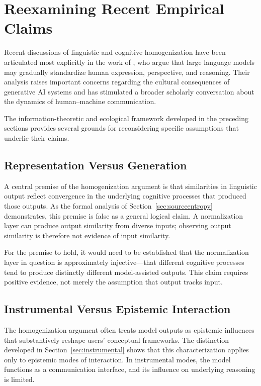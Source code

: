 \documentclass[12pt,a4paper]{article}
\theoremstyle{definition}
\theoremstyle{plain}
\theoremstyle{remark}
\begin{document}
\section{Reexamining Recent Empirical Claims}
\label{sec:sourati}

Recent discussions of linguistic and cognitive homogenization have been articulated most
explicitly in the work of \citet{sourati2026}, who argue that large language models may
gradually standardize human expression, perspective, and reasoning. Their analysis raises
important concerns regarding the cultural consequences of generative AI systems and has
stimulated a broader scholarly conversation about the dynamics of human--machine
communication.

The information-theoretic and ecological framework developed in the preceding sections
provides several grounds for reconsidering specific assumptions that underlie their claims.

\subsection{Representation Versus Generation}

A central premise of the homogenization argument is that similarities in linguistic output
reflect convergence in the underlying cognitive processes that produced those outputs. As the
formal analysis of Section~\ref{sec:sourceentropy} demonstrates, this premise is false as a
general logical claim. A normalization layer can produce output similarity from diverse
inputs; observing output similarity is therefore not evidence of input similarity.

For the premise to hold, it would need to be established that the normalization layer in
question is approximately injective---that different cognitive processes tend to produce
distinctly different model-assisted outputs. This claim requires positive evidence, not
merely the assumption that output tracks input.

\subsection{Instrumental Versus Epistemic Interaction}

The homogenization argument often treats model outputs as epistemic influences that
substantively reshape users' conceptual frameworks. The distinction developed in
Section~\ref{sec:instrumental} shows that this characterization applies only to epistemic
modes of interaction. In instrumental modes, the model functions as a communication interface,
and its influence on underlying reasoning is limited.
\end{document}
